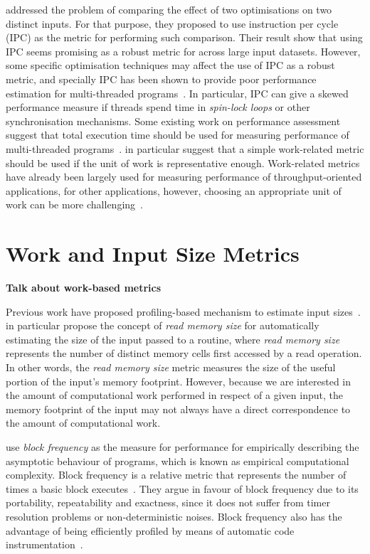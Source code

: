 \cite{fursin07} addressed the problem of comparing the effect of two optimisations on two distinct inputs. For that purpose, they proposed to use instruction per cycle (IPC) as the metric for performing such comparison.
Their result show that using IPC seems promising as a robust metric for {\itercomp} across large input datasets.
However, some specific optimisation techniques may affect the use of IPC as a robust metric, and specially IPC has been shown to provide poor performance estimation for multi-threaded programs~\citep{alameldeen06,eyerman08}.
In particular, IPC can give a skewed performance measure if threads spend time in \textit{spin-lock loops} or other synchronisation mechanisms. 
Some existing work on performance assessment suggest that total execution time should be used for measuring performance of multi-threaded programs~\citep{alameldeen06,eyerman08}.
\cite{alameldeen06} in particular suggest that a simple work-related metric should be used if the unit of work is representative enough.
Work-related metrics have already been largely used for measuring performance of throughput-oriented applications, for other applications, however, choosing an appropriate unit of work can be more challenging~\citep{alameldeen06}.

\section{Work and Input Size Metrics}

\textbf{Talk about work-based metrics}

Previous work have proposed profiling-based mechanism to estimate input sizes~\citep{zaparanuks12,coppa14}.
\cite{coppa14} in particular propose the concept of \textit{read memory size} for automatically estimating the size of the input passed to a routine, where \textit{read memory size} represents the number of distinct memory cells first accessed by a read operation.
In other words, the \textit{read memory size} metric measures the size of the useful portion of the input's memory footprint.
However, because we are interested in the amount of computational work performed in respect of a given input, the memory footprint of the input may not always have a direct correspondence to  the amount of computational work.

\cite{goldsmith07} use \textit{block frequency} as the measure for performance for empirically describing the asymptotic behaviour of programs, which is known as empirical computational complexity.
Block frequency is a relative metric that represents the number of times a basic block executes~\citep{ball94,ball96}.
They argue in favour of block frequency due to its portability, repeatability and exactness, since it does not suffer from timer resolution problems or non-deterministic noises.
Block frequency also has the advantage of being efficiently profiled by means of automatic code instrumentation~\citep{knuth73,ball94}.

